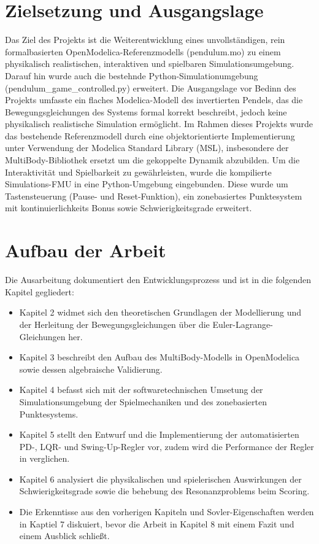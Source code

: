 \section{Zielsetzung und Ausgangslage}
Das Ziel des Projekts ist die Weiterentwicklung eines unvollständigen, rein formalbasierten OpenModelica-Referenzmodells (pendulum.mo) zu einem physikalisch realistischen, interaktiven und spielbaren Simulationsumgebung. Darauf hin wurde auch die bestehnde Python-Simulationumgebung (pendulum\_game\_controlled.py) erweitert. 
Die Ausgangslage vor Bedinn des Projekts umfasste ein flaches Modelica-Modell des invertierten Pendels, das die Bewegungsgleichungen des Systems formal korrekt beschreibt, jedoch keine physikalisch realistische Simulation ermöglicht.
Im Rahmen dieses Projekts wurde das bestehende Referenzmodell durch eine objektorientierte Implementierung unter Verwendung der Modelica Standard Library (MSL), insbesondere der MultiBody-Bibliothek ersetzt um die gekoppelte Dynamik abzubilden.
Um die Interaktivität und Spielbarkeit zu gewährleisten, wurde die kompilierte Simulations-FMU in eine Python-Umgebung eingebunden.
Diese wurde um Tastensteuerung (Pause- und Reset-Funktion), ein zonebasiertes Punktesystem mit kontinuierlichkeits Bonus sowie Schwierigkeitsgrade erweitert.

\section{Aufbau der Arbeit}
Die Ausarbeitung dokumentiert den Entwicklungsprozess und ist in die folgenden Kapitel gegliedert:
\begin{itemize}
    \item Kapitel 2 widmet sich den theoretischen Grundlagen der Modellierung und der Herleitung der Bewegungsgleichungen über die Euler-Lagrange-Gleichungen her.
    \item Kapitel 3 beschreibt den Aufbau des MultiBody-Modells in OpenModelica sowie dessen algebraische Validierung.
    \item Kapitel 4 befasst sich mit der softwaretechnischen Umsetung der Simulationsumgebung der Spielmechaniken und des zonebasierten Punktesystems.
    \item Kapitel 5 stellt den Entwurf und die Implementierung der automatisierten PD-, LQR- und Swing-Up-Regler vor, zudem wird die Performance der Regler in verglichen.
    \item Kapitel 6 analysiert die physikalischen und spielerischen Auswirkungen der Schwierigkeitsgrade sowie die behebung des Resonanzproblems beim Scoring.
    \item Die Erkenntisse aus den vorherigen Kapiteln und Sovler-Eigenschaften werden in Kaptiel 7 diskuiert, bevor die Arbeit in Kapitel 8 mit einem Fazit und einem Ausblick schließt. 
\end{itemize}

